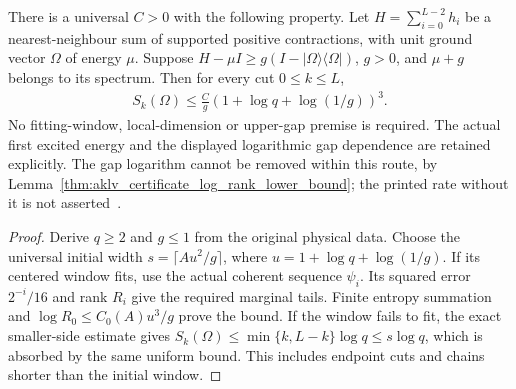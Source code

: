 \begin{theorem}
    \label{thm:aklv_physical_sequence_entropy}
    \leanok
    There is a universal $C>0$ with the following property. Let
    $H=\sum_{i=0}^{L-2}h_i$ be a nearest-neighbour sum of supported
    positive contractions, with unit ground vector $\Omega$ of energy
    $\mu$. Suppose $H-\mu I\ge g(I-|\Omega\rangle\langle\Omega|)$,
    $g>0$, and $\mu+g$ belongs to its spectrum. Then for every cut
    $0\le k\le L$,
    \begin{align*}
        S_k(\Omega)\le\frac{C}{g}
        (1+\log q+\log(1/g))^3.
    \end{align*}
    No fitting-window, local-dimension or upper-gap premise is required.
    The actual first excited energy and the displayed logarithmic gap
    dependence are retained explicitly. The gap logarithm cannot be removed
    within this route, by
    Lemma~\ref{thm:aklv_certificate_log_rank_lower_bound}; the printed rate
    without it is not asserted~\cite{gap:aklv13_entropy_inverse_gap_logarithm}.
\end{theorem}
\begin{proof}
    \leanok
    Derive $q\ge2$ and $g\le1$ from the original physical data. Choose
    the universal initial width $s=\lceil Au^2/g\rceil$, where
    $u=1+\log q+\log(1/g)$.
    If its centered window fits, use the actual coherent sequence
    $\psi_i$. Its squared error $2^{-i}/16$ and rank $R_i$ give the
    required marginal tails. Finite entropy summation and
    $\log R_0\le C_0(A)u^3/g$ prove the bound.
    If the window fails to fit, the exact smaller-side estimate gives
    $S_k(\Omega)\le\min\{k,L-k\}\log q\le s\log q$,
    which is absorbed by the same uniform bound. This includes endpoint
    cuts and chains shorter than the initial window.
\end{proof}
